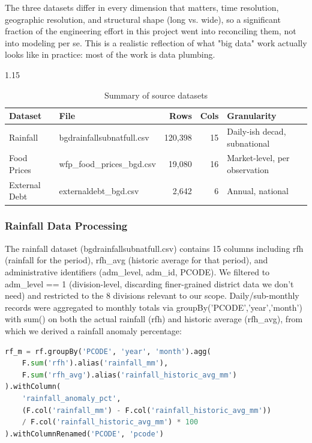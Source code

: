 \documentclass[12pt,a4paper]{article}
\begin{document}
The three datasets differ in every dimension that matters, time resolution, geographic resolution, and structural shape (long vs. wide), so a significant fraction of the engineering effort in this project went into reconciling them, not into modeling per se. This is a realistic reflection of what "big data" work actually looks like in practice: most of the work is data plumbing.
\begin{table}[H]
\centering
\begin{spacing}{1.15}
\caption{Summary of source datasets}
\label{tab:datasets}
\begin{tabularx}{\textwidth}{lXrrl}
\toprule
\textbf{Dataset} & \textbf{File} & \textbf{Rows} & \textbf{Cols} & \textbf{Granularity} \\
\midrule
Rainfall      & bgdrainfallsubnatfull.csv & 120,398 & 15 & Daily-ish decad, subnational \\
Food Prices   & wfp\_food\_prices\_bgd.csv  & 19,080  & 16 & Market-level, per observation \\
External Debt & externaldebt\_bgd.csv       & 2,642   & 6  & Annual, national \\
\bottomrule
\end{tabularx}
\end{spacing}
\end{table}

\subsubsection{Rainfall Data Processing}

The rainfall dataset (bgdrainfallsubnatfull.csv) contains 15 columns including rfh (rainfall for the period), rfh\_avg (historic average for that period), and administrative identifiers (adm\_level, adm\_id, PCODE). We filtered to adm\_level == 1 (division-level, discarding finer-grained district data we don't need) and restricted to the 8 divisions relevant to our scope. Daily/sub-monthly records were aggregated to monthly totals via groupBy('PCODE','year','month') with sum() on both the actual rainfall (rfh) and historic average (rfh\_avg), from which we derived a rainfall anomaly percentage:

\begin{lstlisting}[language=Python]
rf_m = rf.groupBy('PCODE', 'year', 'month').agg(
    F.sum('rfh').alias('rainfall_mm'),
    F.sum('rfh_avg').alias('rainfall_historic_avg_mm')
).withColumn(
    'rainfall_anomaly_pct',
    (F.col('rainfall_mm') - F.col('rainfall_historic_avg_mm')) 
    / F.col('rainfall_historic_avg_mm') * 100
).withColumnRenamed('PCODE', 'pcode')
\end{lstlisting}
\end{document}
